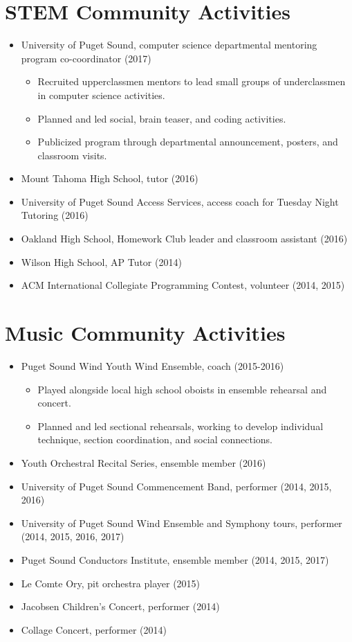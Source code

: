 \section{STEM Community Activities}
\begin{itemize}
\item University of Puget Sound, computer science departmental mentoring program co-coordinator (2017)
\begin{itemize}
\item Recruited upperclassmen mentors to lead small groups of underclassmen in computer science activities.
\item Planned and led social, brain teaser, and coding activities.
\item Publicized program through departmental announcement, posters, and classroom visits.
\end{itemize}
\item Mount Tahoma High School, tutor (2016)
\item University of Puget Sound Access Services, access coach for Tuesday Night Tutoring (2016)
\item Oakland High School, Homework Club leader and classroom assistant (2016)
\item Wilson High School, AP Tutor (2014)
\item ACM International Collegiate Programming Contest, volunteer (2014, 2015)
\end{itemize}
\vspace{-3.5mm}

\section{Music Community Activities}
\begin{itemize}
\item Puget Sound Wind Youth Wind Ensemble, coach (2015-2016)
\begin{itemize}
\item Played alongside local high school oboists in ensemble rehearsal and concert.
\item Planned and led sectional rehearsals, working to develop individual technique, section coordination, and social connections.
\end{itemize}
\item Youth Orchestral Recital Series, ensemble member (2016)
\item University of Puget Sound Commencement Band, performer (2014, 2015, 2016)
\item University of Puget Sound Wind Ensemble and Symphony tours, performer (2014, 2015, 2016, 2017)
\item Puget Sound Conductors Institute, ensemble member (2014, 2015, 2017)
\item Le Comte Ory, pit orchestra player (2015)
\item Jacobsen Children's Concert, performer (2014)
\item Collage Concert, performer (2014)
\end{itemize}
\vspace{-3.5mm}


